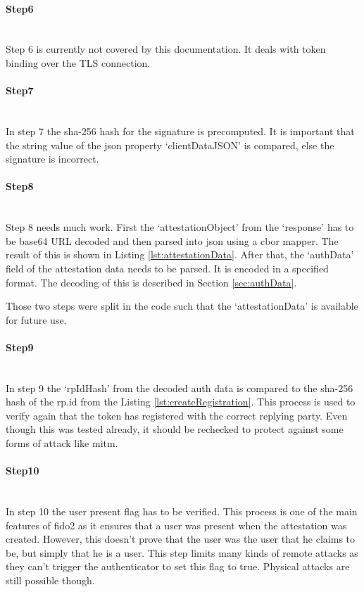 \documentclass[a4paper, 11pt]{scrartcl}
\begin{document}
\paragraph{Step6}\hfill \\ 
Step 6 is currently not covered by this documentation. It deals with token binding over the TLS connection.

\paragraph{Step7}\hfill \\ 
In step 7 the \gls{sha-256} hash for the signature is precomputed. It is important that the string value of the \gls{json} property `clientDataJSON' is compared, else the signature is incorrect.

\paragraph{Step8}\hfill \\ 
Step 8 needs much work. First the `attestationObject' from the `response' has to be \gls{base64} URL decoded and then parsed into \gls{json} using a \gls{cbor} mapper. The result of this is shown in Listing \ref{lst:attestationData}. After that, the `authData' field of the attestation data needs to be parsed. It is encoded in a specified format. The decoding of this is described in Section \ref{sec:authData}. \cite{webauthn:authData}

Those two steps were split in the code such that the `attestationData' is available for future use.



\paragraph{Step9}\hfill \\ 
In step 9 the `rpIdHash' from the decoded auth data is compared to the \gls{sha-256} hash of the rp.id from the Listing \ref{lst:createRegistration}. This process is used to verify again that the token has registered with the correct replying party. Even though this was tested already, it should be rechecked to protect against some forms of attack like \gls{mitm}. 

\paragraph{Step10}\hfill \\ 
In step 10 the user present flag has to be verified. This process is one of the main features of \gls{fido2} as it ensures that a user was present when the attestation was created. However, this doesn't prove that the user was the user that he claims to be, but simply that he is a user. This step limits many kinds of remote attacks as they can't trigger the authenticator to set this flag to true. Physical attacks are still possible though.
\end{document}
